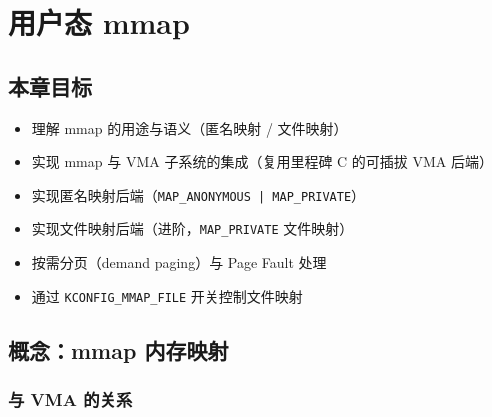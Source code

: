 \chapter{用户态 mmap}
\label{ch:mmap}

\section{本章目标}

\begin{itemize}
  \item 理解 mmap 的用途与语义（匿名映射 / 文件映射）
  \item 实现 mmap 与 VMA 子系统的集成（复用里程碑 C 的可插拔 VMA 后端）
  \item 实现匿名映射后端（\texttt{MAP\_ANONYMOUS | MAP\_PRIVATE}）
  \item 实现文件映射后端（进阶，\texttt{MAP\_PRIVATE} 文件映射）
  \item 按需分页（demand paging）与 Page Fault 处理
  \item 通过 \texttt{KCONFIG\_MMAP\_FILE} 开关控制文件映射
\end{itemize}

\section{概念：mmap 内存映射}
\label{sec:mmap-concept}


\subsection{与 VMA 的关系}

